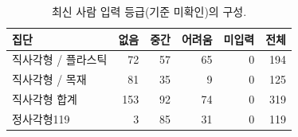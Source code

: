 \begin{table}[t]
\centering\footnotesize
\setlength{\tabcolsep}{3pt}
\caption{최신 사람 입력 등급(기준 미확인)의 구성.}\label{tab:composition}
\begin{tabularx}{\columnwidth}{Yrrrrr}
\toprule
집단 & 없음 & 중간 & 어려움 & 미입력 & 전체 \\
\midrule
직사각형 / 플라스틱 & 72 & 57 & 65 & 0 & 194 \\
직사각형 / 목재 & 81 & 35 & 9 & 0 & 125 \\
직사각형 합계 & 153 & 92 & 74 & 0 & 319 \\
정사각형119 & 3 & 85 & 31 & 0 & 119 \\
\bottomrule
\end{tabularx}
\end{table}
